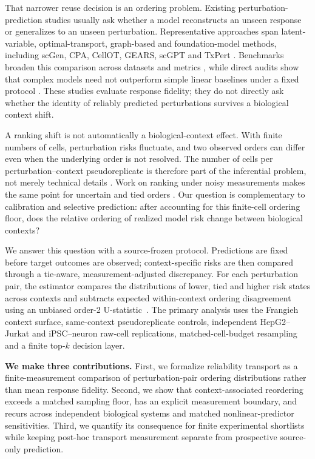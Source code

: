 \documentclass{article}
\begin{document}
That narrower reuse decision is an ordering problem. Existing perturbation-prediction studies
usually ask whether a model reconstructs an unseen response or generalizes to
an unseen perturbation. Representative approaches span latent-variable,
optimal-transport, graph-based and foundation-model methods, including scGen,
CPA, CellOT, GEARS, scGPT and TxPert
\citep{lotfollahi2019scgen,lotfollahi2023cpa,bunne2023cellot,
roohani2023gears,cui2024scgpt,wenkel2026txpert}. Benchmarks broaden this
comparison across datasets and metrics \citep{generalizable2025benchmark},
while direct audits show that complex models need not outperform simple linear
baselines under a fixed protocol \citep{ahlmann2025simple,wong2025simple}.
These studies evaluate response fidelity; they do not directly ask whether
the identity of reliably predicted perturbations survives a biological context
shift.

A ranking shift is not automatically a biological-context effect. With finite
numbers of cells, perturbation risks fluctuate, and two observed orders can
differ even when the underlying order is not resolved. The number of cells per
perturbation--context pseudoreplicate is therefore part of the inferential problem, not merely
technical details \citep{peidli2024scperturb,squair2021augur}. Work on ranking
under noisy measurements makes the same point for uncertain and tied orders
\citep{zuk2007ranking,sankaran2025ranking}. Our question is complementary to
calibration and selective prediction: after accounting for this finite-cell
ordering floor, does the relative ordering of realized model risk change
between biological contexts?

We answer this question with a source-frozen protocol. Predictions are fixed
before target outcomes are observed; context-specific risks are then compared
through a tie-aware, measurement-adjusted discrepancy. For each perturbation
pair, the estimator compares the distributions of lower, tied and higher risk
states across contexts and subtracts expected within-context ordering disagreement
using an unbiased order-2 U-statistic~\citep{hoeffding1948class}. The primary
analysis uses the Frangieh context surface, same-context pseudoreplicate
controls, independent HepG2--Jurkat and iPSC--neuron raw-cell replications,
matched-cell-budget resampling and a finite top-$k$ decision layer.

\textbf{We make three contributions.} First, we formalize reliability transport
as a finite-measurement comparison of perturbation-pair ordering distributions
rather than mean response fidelity. Second, we show that context-associated
reordering exceeds a matched sampling floor, has an explicit measurement
boundary, and recurs across independent biological systems and matched
nonlinear-predictor sensitivities. Third, we quantify its consequence for
finite experimental shortlists while keeping post-hoc transport measurement
separate from prospective source-only prediction.
\end{document}

